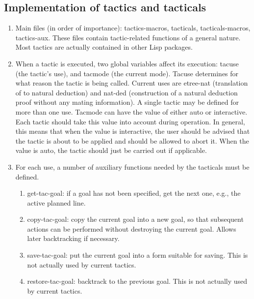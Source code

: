 


\subsection{Implementation of tactics and tacticals}

\begin{enumerate}
\item Main files (in order of importance): tactics-macros, tacticals,
tacticals-macros, tactics-aux.  These files contain tactic-related functions 
of a general nature.  Most tactics are actually contained in other Lisp packages.

\item When a tactic is executed, two global variables affect its
execution: tacuse (the tactic's use), and tacmode (the current mode).
Tacuse determines for what reason the tactic is being called.  Current
uses are etree-nat (translation of  to natural deduction) and
nat-ded (construction of a natural deduction proof without any mating
information).  A single tactic may be defined for more than one use.
Tacmode can have the value of either auto or interactive.  Each tactic
should take this value into account during operation.  In general,
this means that when the value is interactive, the user should be
advised that the tactic is about to be applied and should be allowed
to abort it.  When the value is auto, the tactic should just be
carried out if applicable.  

\item For each use, a number of auxiliary functions needed by the
tacticals must be defined.

\begin{enumerate}
\item get-tac-goal: if a goal has not been specified, get the next one,
e.g., the active planned line.

\item copy-tac-goal: copy the current goal into a new goal, so that subsequent
actions can be performed without destroying the current goal.  Allows
later backtracking if necessary.

\item save-tac-goal: put the current goal into a form suitable for
saving.  This is not actually used by current tactics.

\item restore-tac-goal: backtrack to the previous goal. 
This is not actually used by current tactics.


\end{enumerate}
\end{enumerate}
